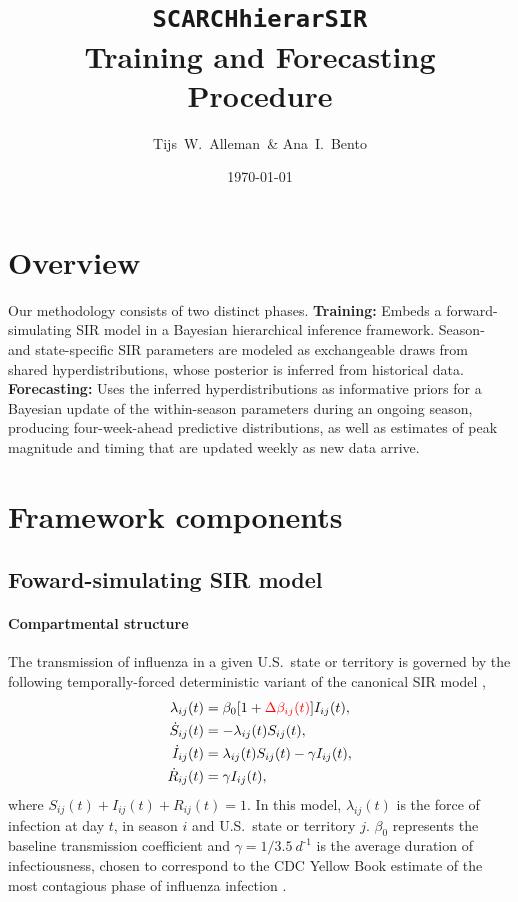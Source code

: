\documentclass[11pt]{article}
\title{\texttt{SCARCHhierarSIR}\\Training and Forecasting Procedure}
\author{Tijs~W.~Alleman~\& Ana~I.~Bento}
\date{\today}
\begin{document}
\maketitle


\section{Overview}

Our methodology consists of two distinct phases. \textbf{Training:} Embeds a forward-simulating SIR model in a Bayesian hierarchical inference framework. Season- and state-specific SIR parameters are modeled as exchangeable draws from shared hyperdistributions, whose posterior is inferred from historical data. \textbf{Forecasting:} Uses the inferred hyperdistributions as informative priors for a Bayesian update of the within-season parameters during an ongoing season, producing four-week-ahead predictive distributions, as well as estimates of peak magnitude and timing that are updated weekly as new data arrive.

\section{Framework components}
\subsection{Foward-simulating SIR model}


\paragraph{Compartmental structure} The transmission of influenza in a given U.S.\ state or territory is governed by the following temporally-forced deterministic variant of the canonical SIR model \citep{keeling2008},
\begin{align}
    \lambda_{ij}(t) &= \beta_0 [1 + \textcolor{red}{\Delta \beta_{ij}(t)}]  I_{ij}(t), \nonumber \\
    \dot{S}_{ij}(t) &= - \lambda_{ij}(t) S_{ij}(t), \nonumber \\ 
    \dot{I}_{ij}(t) &= \lambda_{ij}(t) S_{ij}(t) - \gamma I_{ij}(t), \nonumber \\
    \dot{R}_{ij}(t) &= \gamma I_{ij}(t),
    \label{eq:ODE_simulation}
\end{align}
where $S_{ij}(t) + I_{ij}(t) + R_{ij}(t) = 1$. In this model, $\lambda_{ij}(t)$ is the force of infection at day $t$, in season $i$ and U.S.\ state or territory $j$. $\beta_0$ represents the baseline transmission coefficient and $\gamma=1/3.5~d^{\text{-}1}$ is the average duration of infectiousness, chosen to correspond to the CDC Yellow Book estimate of the most contagious phase of influenza infection \citep{CDCyellowbook}.\\
\end{document}
